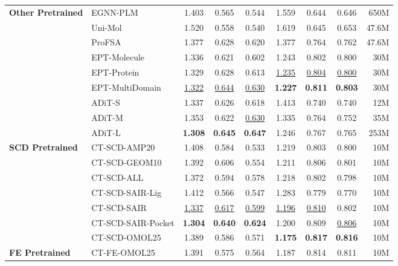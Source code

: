 \begin{table}[t]
\begin{tabular*}{\textwidth}{@{\extracolsep{\fill}}l l ccc ccc r}
\midrule
\textbf{Other Pretrained} 
 & EGNN-PLM \cite{EGNN-PLM_wu2023geometric} & 1.403 & 0.565 & 0.544 & 1.559 & 0.644 & 0.646  & 650M\\
 & Uni-Mol \cite{UniMol_Zhou2023} & 1.520 & 0.558 & 0.540 & 1.619 & 0.645 & 0.653  &47.6M\\
 & ProFSA \cite{profsa_2023} & 1.377 & 0.628 & 0.620 & 1.377 & 0.764 & 0.762  & 47.6M\\
 & EPT-Molecule \cite{EPT_jiao2025} & 1.336& 0.621& 0.602& 1.243& 0.802 & 0.800 &30M\\
 & EPT-Protein \cite{EPT_jiao2025} & 1.329& 0.628& 0.613& \underline{1.235} & \underline{0.804} & \underline{0.800} &30M\\
 & EPT-MultiDomain \cite{EPT_jiao2025}  & \underline{1.322} & \underline{0.644} & \underline{0.630} & 
 \textbf{1.227} & \textbf{0.811} & \textbf{0.803}  &30M\\
& ADiT-S \cite{lba-adit} & 1.337 & 0.626 & 0.618 & 1.413 & 0.740 & 0.740   & 12M \\
& ADiT-M \cite{lba-adit} & 1.353 & 0.622 & \underline{0.630} & 1.335  & 0.764 & 0.752  & 35M \\
& ADiT-L \cite{lba-adit} & \textbf{1.308} & \textbf{0.645} & \textbf{0.647} & 1.246  & 0.767 & 0.765  & 253M\\

\midrule
\textbf{SCD Pretrained} 
 & CT-SCD-AMP20 & 1.408 & 0.584 & 0.533 & 1.219 & 0.803 & 0.800 & 10M \\
 & CT-SCD-GEOM10 & 1.392 & 0.606 & 0.554 & 1.211 & 0.806 & 0.801 & 10M \\
 & CT-SCD-ALL & 1.372 & 0.594 & 0.578 & 1.218 & 0.802 & 0.798 & 10M \\
 & CT-SCD-SAIR-Lig & 1.412 & 0.566 & 0.547 & 1.283 & 0.779 & 0.770 & 10M \\
 & CT-SCD-SAIR & \underline{1.337} & \underline{0.617} & \underline{0.599} & \underline{1.196} & \underline{0.810} & 0.802 & 10M \\
 & CT-SCD-SAIR-Pocket & \textbf{1.304} & \textbf{0.640} & \textbf{0.624} & 1.200 & 0.809 & \underline{0.806} & 10M \\ 
 & CT-SCD-OMOL25 & 1.389 & 0.586 & 0.571 & \textbf{1.175} & \textbf{0.817} & \textbf{0.816} & 10M \\

\midrule
\textbf{FE Pretrained} 
& CT-FE-OMOL25 & 1.391 & 0.575 & 0.564 & 1.187 & 0.814 & 0.811 & 10M \\
\bottomrule
\end{tabular*}
\end{table}